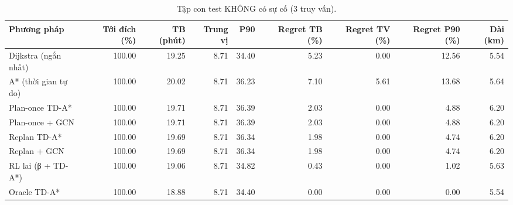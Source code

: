 \begin{table}[!htbp]
\centering
\small
\caption{Tập con test KHÔNG có sự cố (3 truy vấn).}
\label{tab:tab_results_noinc}
\begin{adjustbox}{max width=\linewidth}
\begin{tabular}{lrrrrrrrr}
\toprule
Phương pháp & Tới đích (\%) & TB (phút) & Trung vị & P90 & Regret TB (\%) & Regret TV (\%) & Regret P90 (\%) & Dài (km) \\
\midrule
Dijkstra (ngắn nhất) & 100.00 & 19.25 & 8.71 & 34.40 & 5.23 & 0.00 & 12.56 & 5.54 \\
A* (thời gian tự do) & 100.00 & 20.02 & 8.71 & 36.23 & 7.10 & 5.61 & 13.68 & 5.64 \\
Plan-once TD-A* & 100.00 & 19.71 & 8.71 & 36.39 & 2.03 & 0.00 & 4.88 & 6.20 \\
Plan-once + GCN & 100.00 & 19.71 & 8.71 & 36.39 & 2.03 & 0.00 & 4.88 & 6.20 \\
Replan TD-A* & 100.00 & 19.69 & 8.71 & 36.34 & 1.98 & 0.00 & 4.74 & 6.20 \\
Replan + GCN & 100.00 & 19.69 & 8.71 & 36.34 & 1.98 & 0.00 & 4.74 & 6.20 \\
RL lai (β + TD-A*) & 100.00 & 19.06 & 8.71 & 34.82 & 0.43 & 0.00 & 1.02 & 5.63 \\
Oracle TD-A* & 100.00 & 18.88 & 8.71 & 34.40 & 0.00 & 0.00 & 0.00 & 5.54 \\
\bottomrule
\end{tabular}
\end{adjustbox}
\end{table}
